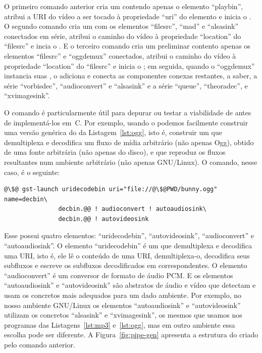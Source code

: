 \documentclass{SBCbookchapter}
\begin{document}
O primeiro comando anterior cria um  contendo apenas o elemento
``playbin'', atribui a URI do vídeo a ser tocado à propriedade ``uri'' do
elemento e inicia o .  O segundo comando cria um 
com os elementos ``filesrc'', ``mad'' e ``alsasink'' conectados em série,
atribui o caminho do vídeo à propriedade ``location'' do ``filesrc'' e incia
o .  E o terceiro comando cria um  preliminar
contento apenas os elementos ``filesrc'' e ``oggdemux'' conectados, atribui
o caminho do vídeo à propriedade ``location'' do ``filesrc'' e inicia o
; em seguida, quando o ``oggdemux'' instancia suas
, o  adiciona e conecta as componentes
conexas restantes, a saber, a série ``vorbisdec'', ``audioconvert'' e
``alsasink'' e a série ``queue'', ``theoradec'', e ``xvimagesink''.

O comando  é particularmente útil para depurar ou testar a
viabilidade de  antes de implementá-los em~C\null.  Por
exemplo, usando o  podemos facilmente construir uma versão
genérica do  da Listagem~\ref{lst:ogg}, isto é, construir um
 que demultiplexa e decodifica um fluxo de mídia arbitrário
(não apenas Ogg), obtido de uma fonte arbitrária (não apenas do disco), e
que reproduz os fluxos resultantes num ambiente arbitrário (não apenas
GNU/Linux).  O comando, nesse caso, é o seguinte:
\begin{lstlisting}[style=command]
@\$@ gst-launch uridecodebin uri="file://@\$@PWD/bunny.ogg" name=decbin\
               decbin.@@ ! audioconvert ! autoaudiosink\
               decbin.@@ ! autovideosink
\end{lstlisting}

Esse  possui quatro elementos: ``uridecodebin'',
``autovideosink'', ``audioconvert'' e ``autoaudiosink''.  O elemento
``uridecodebin'' é um \en{bin} que demultiplexa e decodifica uma URI, isto
é, ele lê o conteúdo de uma URI, demultiplexa-o, decodifica seus subfluxos e
escreve os subfluxos decodificados em \en{sometimes pads} correspondentes.
O elemento ``audioconvert'' é um conversor de formato de áudio PCM\null.
E os elementos ``autoaudiosink'' e ``autovideosink'' são \en{sinks}
abstratos de áudio e vídeo que detectam e usam os  concretos mais
adequados para um dado ambiente.  Por exemplo, no nosso ambiente GNU/Linux
os elementos ``autoaudiosink'' e ``autovideosink'' utilizam os \en{sinks}
concretos ``alsasink'' e ``xvimagesink'', os mesmos que usamos nos programas
das Listagens~\ref{lst:mp3} e~\ref{lst:ogg}, mas em outro ambiente essa
escolha pode ser diferente.  A Figura~\ref{fig:pipe-gen} apresenta a
estrutura do \en{pipeline} criado pelo comando \en{gst-launch} anterior.
\end{document}

